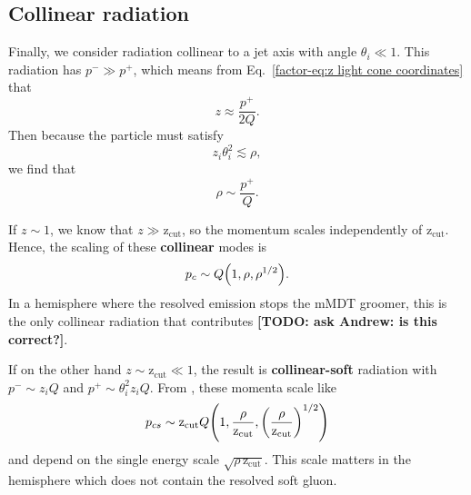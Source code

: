 \documentclass[../thesis.tex]{subfiles}
\providecommand{\zcut}{\mathrm{z_{cut}}}
\begin{document}

\subsection{Collinear radiation}\label{sec:collinear radiation}
	Finally, we consider radiation collinear to a jet axis with angle $\theta_i \ll 1$. This radiation has $p^- \gg p^+$, which means from Eq.~\ref{factor-eq:z light cone coordinates} that
	\begin{equation}
		z \approx \frac{p^+}{2Q}.
	\end{equation}
	Then because the particle must satisfy
	\begin{equation}
		z_i \theta_i^2 \lesssim \rho,
	\end{equation}
	we find that \cite{frye_factorization_2016}
	\begin{equation}
		\rho \sim \frac{p^+}{Q}.
	\end{equation}

	If $z \sim 1$, we know that $z \gg \zcut$, so the momentum scales independently of $\zcut$. Hence, the scaling of these \textbf{collinear} modes is \cite{frye_factorization_2016}
	\begin{equation}
		p_c \sim Q \qty(1, \rho, \rho^{1/2}).
	\end{equation}
	In a hemisphere where the resolved emission stops the mMDT groomer, this is the only collinear radiation that contributes {\color{red}\textbf{[TODO: ask Andrew: is this correct?]}}.

	If on the other hand $z \sim \zcut \ll 1$, the result is \textbf{collinear-soft} radiation with $p^- \sim z_i Q$ and $p^+ \sim \theta_i^2 z_i Q$. From \cite{frye_factorization_2016}, these momenta scale like
	\begin{equation}
		p_{cs} \sim \zcut Q \qty(1, \frac{\rho}{\zcut}, \qty(\frac{\rho}{\zcut})^{1/2})
	\end{equation}
	and depend on the single energy scale $\sqrt{\rho\,\zcut}$. This scale matters in the hemisphere which does not contain the resolved soft gluon.
\end{document}
